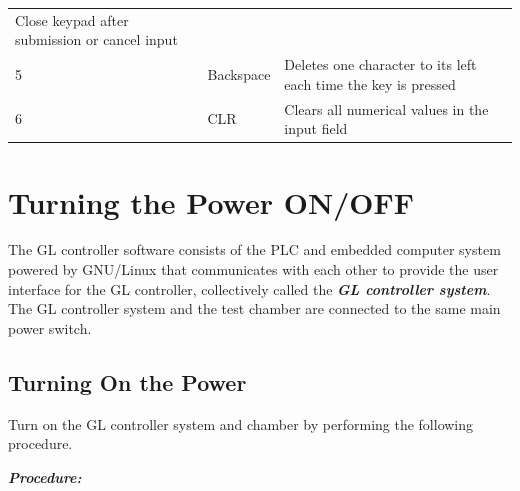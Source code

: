 \begin{longtable}[]{@{}lll@{}}
\begin{minipage}[t]{0.65\columnwidth}
Close keypad after submission or cancel input\strut
\end{minipage}\tabularnewline
\begin{minipage}[t]{0.04\columnwidth}\raggedright
5\strut
\end{minipage} & \begin{minipage}[t]{0.23\columnwidth}\raggedright
Backspace\strut
\end{minipage} & \begin{minipage}[t]{0.65\columnwidth}\raggedright
Deletes one character to its left each time the key is pressed\strut
\end{minipage}\tabularnewline
\begin{minipage}[t]{0.04\columnwidth}\raggedright
6\strut
\end{minipage} & \begin{minipage}[t]{0.23\columnwidth}\raggedright
CLR\strut
\end{minipage} & \begin{minipage}[t]{0.65\columnwidth}\raggedright
Clears all numerical values in the input field\strut
\end{minipage}\tabularnewline
\bottomrule
\end{longtable}


\section{Turning the Power
ON/OFF}

The GL controller software consists of the PLC and embedded computer
system powered by GNU/Linux that communicates with each other to provide
the user interface for the GL controller, collectively called the
\emph{\textbf{GL controller system}}. The GL controller system and the
test chamber are connected to the same main power switch.


\subsection{Turning On the Power}

Turn on the GL controller system and chamber by performing the following
procedure.

\textbf{\emph{Procedure:}}

